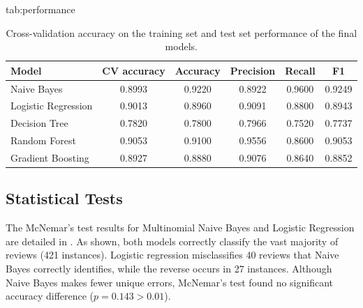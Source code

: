 \documentclass[pmlr]{jmlr}%
\begin{document}
\begin{table}[H]
\floatconts
  {tab:performance}%
  {\caption{Cross-validation accuracy on the training set and test set performance of the final models.}}%
  {\begin{tabular}{lSSSSS}
  \toprule
  \bfseries Model & {\bfseries CV accuracy} & {\bfseries Accuracy} & {\bfseries Precision} & {\bfseries Recall} & {\bfseries F1}\\
  \midrule
  Naive Bayes & 0.8993 & 0.9220 & 0.8922 & 0.9600 & 0.9249\\
  Logistic Regression & 0.9013 & 0.8960 & 0.9091 & 0.8800 & 0.8943\\
  Decision Tree & 0.7820 & 0.7800 & 0.7966 & 0.7520 & 0.7737\\
  Random Forest & 0.9053 & 0.9100 & 0.9556 & 0.8600 & 0.9053\\
  Gradient Boosting & 0.8927 & 0.8880 & 0.9076 & 0.8640 & 0.8852\\
  \bottomrule
  \end{tabular}}
\end{table}

\subsection{Statistical Tests}
\label{sec:statistical-tests}

The McNemar's test results for Multinomial Naive Bayes and Logistic Regression are detailed in .
As shown, both models correctly classify the vast majority of reviews (421 instances).
Logistic regression misclassifies 40 reviews that Naive Bayes correctly identifies, while the reverse occurs in 27 instances.
Although Naive Bayes makes fewer unique errors, McNemar's test found no significant accuracy difference ($p = 0.143 > 0.01$).
\end{document}
